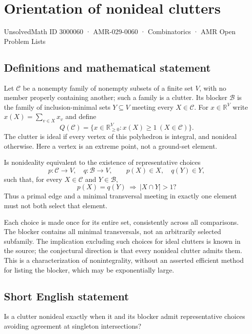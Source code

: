\documentclass[11pt,a4paper]{article}
\begin{document}
\section*{Orientation of nonideal clutters}\label{3000060}
{\small UnsolvedMath ID 3000060 · AMR-029-0060 · Combinatorics · AMR Open Problem Lists}
\subsection{Definitions and mathematical statement}
Let $\mathcal C$ be a nonempty family of nonempty subsets of a finite
set $V$, with no member properly containing another; such a family is
a clutter. Its blocker $\mathcal B$ is the family of inclusion-minimal
sets $Y\subseteq V$ meeting every $X\in\mathcal C$.
For $x\in\mathbb R^V$ write $x(X)=\sum_{v\in X}x_v$ and define
\[
 Q(\mathcal C)=\{x\in\mathbb R_{\ge0}^V:
                              x(X)\ge1\ (X\in\mathcal C)\}.
\]
The clutter is ideal if every vertex of this polyhedron is integral,
and nonideal otherwise. Here a vertex is an extreme point, not a
ground-set element.

Is nonideality equivalent to the existence of representative choices
\[
 p:\mathcal C\to V,\quad q:\mathcal B\to V,
 \qquad p(X)\in X,\quad q(Y)\in Y,
\]
such that, for every $X\in\mathcal C$ and $Y\in\mathcal B$,
\[
                   p(X)=q(Y)\ \Longrightarrow\ |X\cap Y|>1?
\]
Thus a primal edge and a minimal transversal meeting in exactly one
element must not both select that element.

Each choice is made once for its entire set, consistently across all
comparisons. The blocker contains all minimal transversals, not an
arbitrarily selected subfamily. The implication excluding such choices
for ideal clutters is known in the source; the conjectural direction
is that every nonideal clutter admits them. This is a characterization
of nonintegrality, without an asserted efficient method for listing
the blocker, which may be exponentially large.
\subsection{Short English statement}
Is a clutter nonideal exactly when it and its blocker admit representative choices avoiding agreement at singleton intersections?
\end{document}
